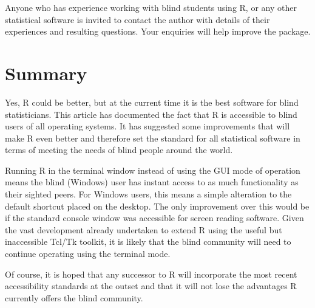 Anyone who has experience working with blind students using R, or any other statistical software is invited to contact the author with details of their experiences and resulting questions. Your enquiries will help improve the  package.


\section{Summary}


Yes, R could be better, but at the current time it is the best software for blind statisticians. This article has documented the fact that R is accessible to blind users of all operating systems. It has suggested some improvements that will make R even better and therefore set the standard for all statistical software in terms of meeting the needs of blind people around the world.

Running R in the terminal window instead of using the GUI mode of operation means the blind (Windows) user has instant access to as much functionality as their sighted peers. For Windows users, this means a simple alteration to the default shortcut placed on the desktop. The only improvement over this would be if the standard console window was accessible for screen reading software. Given the vast development already undertaken to extend R using the useful but inaccessible Tcl/Tk toolkit, it is likely that the blind community will need to continue operating using the terminal mode.

Of course, it is hoped that any successor to R will incorporate the most recent accessibility standards at the outset and that it will not lose the advantages R currently offers the blind community.



\address{A. Jonathan R. Godfrey\\
Massey University\\
Palmerston North\\
New Zealand}\\


